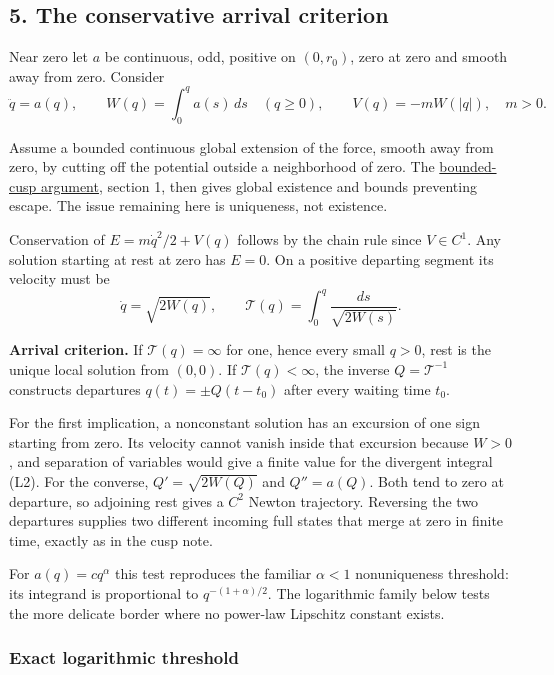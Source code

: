 \documentclass[11pt,a4paper]{article}
\begin{document}
\subsection{5. The conservative arrival
criterion}\label{the-conservative-arrival-criterion}

Near zero let \(a\) be continuous, odd, positive on \((0,r_0)\), zero at
zero and smooth away from zero. Consider \[
 \ddot q=a(q),\qquad W(q)=\int_0^q a(s)\,ds\quad(q\ge0),
 \qquad V(q)=-mW(|q|),\quad m>0.
 \tag{L1}
\]

Assume a bounded continuous global extension of the force, smooth away
from zero, by cutting off the potential outside a neighborhood of zero.
The \href{newton-cusp-preparation-floor.md}{bounded-cusp argument},
section 1, then gives global existence and bounds preventing escape. The
issue remaining here is uniqueness, not existence.

Conservation of \(E=m\dot q^2/2+V(q)\) follows by the chain rule since
\(V\in C^1\). Any solution starting at rest at zero has \(E=0\). On a
positive departing segment its velocity must be \[
 \dot q=\sqrt{2W(q)},\qquad
 \mathcal T(q)=\int_0^q\frac{ds}{\sqrt{2W(s)}}.
 \tag{L2}
\]

\textbf{Arrival criterion.} If \(\mathcal T(q)=\infty\) for one, hence
every small \(q>0\), rest is the unique local solution from \((0,0)\).
If \(\mathcal T(q)<\infty\), the inverse \(Q=\mathcal T^{-1}\)
constructs departures \(q(t)=\pm Q(t-t_0)\) after every waiting time
\(t_0\).

For the first implication, a nonconstant solution has an excursion of
one sign starting from zero. Its velocity cannot vanish inside that
excursion because \(W>0\), and separation of variables would give a
finite value for the divergent integral (L2). For the converse,
\(Q'=\sqrt{2W(Q)}\) and \(Q''=a(Q)\). Both tend to zero at departure, so
adjoining rest gives a \(C^2\) Newton trajectory. Reversing the two
departures supplies two different incoming full states that merge at
zero in finite time, exactly as in the cusp note.

For \(a(q)=c q^\alpha\) this test reproduces the familiar \(\alpha<1\)
nonuniqueness threshold: its integrand is proportional to
\(q^{-(1+\alpha)/2}\). The logarithmic family below tests the more
delicate border where no power-law Lipschitz constant exists.

\subsubsection{Exact logarithmic
threshold}\label{exact-logarithmic-threshold}
\end{document}
